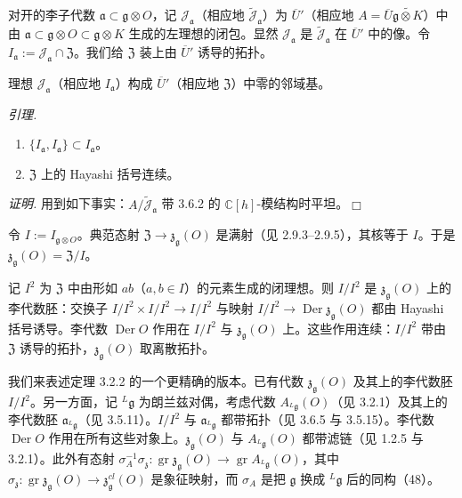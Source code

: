  对开的李子代数 $\mathfrak{a} \subset \mathfrak{g}\otimes O$，记 $\mathcal{J}_{\mathfrak{a}}$（相应地 $\widetilde{\mathcal{J}}_{\mathfrak{a}}$）为 $\overline{U}'$（相应地 $A = \overline{U}\widetilde{\mathfrak{g}\otimes K}$）中由 $\mathfrak{a} \subset \mathfrak{g}\otimes O \subset \mathfrak{g}\otimes K$ 生成的左理想的闭包。显然 $\mathcal{J}_{\mathfrak{a}}$ 是 $\widetilde{\mathcal{J}}_{\mathfrak{a}}$ 在 $\overline{U}'$ 中的像。令 $I_{\mathfrak{a}} := \mathcal{J}_{\mathfrak{a}} \cap \mathfrak{Z}$。我们给 $\mathfrak{Z}$ 装上由 $\overline{U}'$ 诱导的拓扑。


理想 $\mathcal{J}_{\mathfrak{a}}$（相应地 $I_{\mathfrak{a}}$）构成 $\overline{U}'$（相应地 $\mathfrak{Z}$）中零的邻域基。

 \emph{引理.}
\begin{enumerate}[label=(\roman*),leftmargin=2.2em]
  \item $\{I_{\mathfrak{a}}, I_{\mathfrak{a}}\} \subset I_{\mathfrak{a}}$。
  \item $\mathfrak{Z}$ 上的 Hayashi 括号连续。
\end{enumerate}

\emph{证明.} 用到如下事实：$A/\widetilde{\mathcal{J}}_{\mathfrak{a}}$ 带 3.6.2 的 $\mathbb{C}[h]$-模结构时平坦。\hfill$\Box$

 令 $I := I_{\mathfrak{g}\otimes O}$。典范态射 $\mathfrak{Z} \to \mathfrak{z}_{\mathfrak{g}}(O)$ 是满射（见 2.9.3--2.9.5），其核等于 $I$。于是 $\mathfrak{z}_{\mathfrak{g}}(O) = \mathfrak{Z}/I$。

记 $I^{2}$ 为 $\mathfrak{Z}$ 中由形如 $ab$（$a, b \in I$）的元素生成的闭理想。则 $I/I^{2}$ 是 $\mathfrak{z}_{\mathfrak{g}}(O)$ 上的李代数胚：交换子 $I/I^{2} \times I/I^{2} \to I/I^{2}$ 与映射 $I/I^{2} \to \operatorname{Der}\mathfrak{z}_{\mathfrak{g}}(O)$ 都由 Hayashi 括号诱导。李代数 $\operatorname{Der} O$ 作用在 $I/I^{2}$ 与 $\mathfrak{z}_{\mathfrak{g}}(O)$ 上。这些作用连续：$I/I^{2}$ 带由 $\mathfrak{Z}$ 诱导的拓扑，$\mathfrak{z}_{\mathfrak{g}}(O)$ 取离散拓扑。

 我们来表述定理 3.2.2 的一个更精确的版本。已有代数 $\mathfrak{z}_{\mathfrak{g}}(O)$ 及其上的李代数胚 $I/I^{2}$。另一方面，记 ${}^{L}\mathfrak{g}$ 为朗兰兹对偶，考虑代数 $A_{{}^{L}\mathfrak{g}}(O)$（见 3.2.1）及其上的李代数胚 $\mathfrak{a}_{{}^{L}\mathfrak{g}}$（见 3.5.11）。$I/I^{2}$ 与 $\mathfrak{a}_{{}^{L}\mathfrak{g}}$ 都带拓扑（见 3.6.5 与 3.5.15）。李代数 $\operatorname{Der} O$ 作用在所有这些对象上。$\mathfrak{z}_{\mathfrak{g}}(O)$ 与 $A_{{}^{L}\mathfrak{g}}(O)$ 都带滤链（见 1.2.5 与 3.2.1）。此外有态射 $\sigma_{A}^{-1}\sigma_{\mathfrak{z}}: \operatorname{gr}\mathfrak{z}_{\mathfrak{g}}(O) \to \operatorname{gr} A_{{}^{L}\mathfrak{g}}(O)$，其中 $\sigma_{\mathfrak{z}}: \operatorname{gr}\mathfrak{z}_{\mathfrak{g}}(O) \to \mathfrak{z}^{cl}_{\mathfrak{g}}(O)$ 是象征映射，而 $\sigma_{A}$ 是把 $\mathfrak{g}$ 换成 ${}^{L}\mathfrak{g}$ 后的同构（48）。

